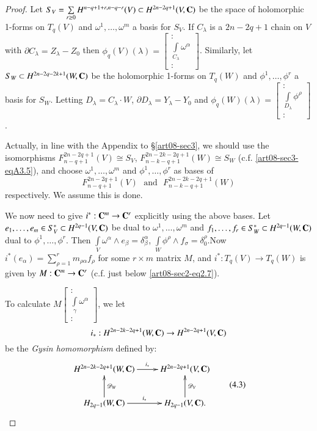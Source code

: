 \begin{proof}
Let $S_{V}=\sum\limits_{r\geq 0}H^{n-q+1+r,n-q-r}(V)\subset H^{2n-2q+1}(V,\mathbf{C})$ be the space of holomorphic 1-forms on $T_{q}(V)$ and $\omega^{1},\ldots,\omega^{m}$ a basis for $S_{V}$. If $C_{\lambda}$ is a $2n-2q+1$ chain on $V$ with $\partial C_{\lambda}=Z_{\lambda}-Z_{0}$ then $\phi_{q}(V)(\lambda)=\left[\begin{smallmatrix} :\\ \int\limits_{C_{\lambda}}\omega^{\alpha}\\ :\end{smallmatrix}\right]$. Similarly, let $S_{W}\subset H^{2n-2q-2k+1}(W,\mathbf{C})$ be the holomorphic 1-forms on $T_{q}(W)$ and $\phi^{1},\ldots,\phi^{r}$ a basis for $S_{W}$. Letting $D_{\lambda}=C_{\lambda}\cdot W$, $\partial D_{\lambda}=Y_{\lambda}-Y_{0}$ and $\phi_{q}(W)(\lambda)=\left[\begin{smallmatrix} :\\ \int\limits_{D_{\lambda}}\phi^{\rho}\\ :\end{smallmatrix}\right]$.

Actually, in line with the Appendix to \S\ref{art08-sec3}, we should use the isomorphisms $F^{2n-2q+1}_{n-q+1}(V)\cong S_{V}$, $F^{2n-2k-2q+1}_{n-k-q+1}(W)\cong S_{W}$ (c.f. \eqref{art08-sec3-eqA3.5}), and choose $\omega^{1},\ldots,\omega^{m}$ and $\phi^{1},\ldots,\phi^{r}$ as bases of 
$$
F^{2n-2q+1}_{n-q+1}(V)\text{~ and~ } F^{2n-2k-2q+1}_{n-k-q+1}(W)
$$ 
respectively. We assume this is done.

We now need to give $i^{*}:\mathbf{C}^{m}\to \mathbf{C}^{r}$ explicitly using the above bases. Let $e_{1},\ldots,e_{m}\in S^{*}_{V}\subset H^{2q-1}(V,\mathbf{C})$ be dual to $\omega^{1},\ldots,\omega^{m}$ and $f_{1},\ldots,f_{r}\in S^{*}_{W}\subset H^{2q-1}(W,\mathbf{C})$ dual to $\phi^{1},\ldots,\phi^{r}$. Then $\int\limits_{V}\omega^{\alpha}\wedge e_{\beta}=\delta^{\alpha}_{\beta}$, $\int\limits_{W}\phi^{\rho}\wedge f_{\sigma}=\delta^{\rho}_{0}$.\pageoriginale Now $i^{*}(e_{\alpha})=\sum\limits^{r}_{\rho=1}m_{\rho\alpha}f_{\rho}$ for some $r\times m$ matrix $M$, and $i^{*}:T_{q}(V)\to T_{q}(W)$ is given by $M:\mathbf{C}^{m}\to \mathbf{C}^{r}$ (c.f. just below \eqref{art08-sec2-eq2.7}).

To calculate $M\left[\begin{smallmatrix} : \\ \int\limits_{\gamma}\omega^{\alpha}\\ :\end{smallmatrix}\right]$, we let 
$$
i_{*}:H^{2n-2k-2q+1}(W,\mathbf{C})\to H^{2n-2q+1}(V,\mathbf{C})
$$ 
be the {\em Gysin homomorphism} defined by:
\begin{equation*}
\vcenter{\xymatrix{
H^{2n-2k-2q+1}(W,\bfC)\ar[r]^-{i_{*}} & H^{2n-2q+1}(V,\bfC)\\
H_{2q-1}(W,\bfC)\ar[u]_{\mathscr{D}_{W}}\ar[r]^-{i_{*}} & H_{2q-1}(V,\bfC).\ar[u]_{\mathscr{D}_{V}}
}}\tag{4.3}\label{art08-sec4-eq4.3}
\end{equation*}


\end{proof}
